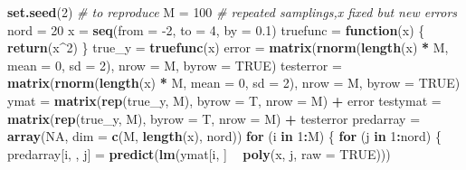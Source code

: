 \documentclass[]{article}
\newenvironment{Shaded}{\begin{snugshade}}{\end{snugshade}}
\newcommand{\CommentTok}[1]{\textcolor[rgb]{0.56,0.35,0.01}{\textit{#1}}}
\newcommand{\ControlFlowTok}[1]{\textcolor[rgb]{0.13,0.29,0.53}{\textbf{#1}}}
\newcommand{\DataTypeTok}[1]{\textcolor[rgb]{0.13,0.29,0.53}{#1}}
\newcommand{\DecValTok}[1]{\textcolor[rgb]{0.00,0.00,0.81}{#1}}
\newcommand{\FloatTok}[1]{\textcolor[rgb]{0.00,0.00,0.81}{#1}}
\newcommand{\KeywordTok}[1]{\textcolor[rgb]{0.13,0.29,0.53}{\textbf{#1}}}
\newcommand{\NormalTok}[1]{#1}
\newcommand{\OperatorTok}[1]{\textcolor[rgb]{0.81,0.36,0.00}{\textbf{#1}}}
\newcommand{\OtherTok}[1]{\textcolor[rgb]{0.56,0.35,0.01}{#1}}
\newcommand{\StringTok}[1]{\textcolor[rgb]{0.31,0.60,0.02}{#1}}
\begin{document}
\begin{Shaded}
\begin{Highlighting}[]
\KeywordTok{set.seed}\NormalTok{(}\DecValTok{2}\NormalTok{)  }\CommentTok{# to reproduce}
\NormalTok{M =}\StringTok{ }\DecValTok{100}  \CommentTok{# repeated samplings,x fixed but new errors}
\NormalTok{nord =}\StringTok{ }\DecValTok{20}
\NormalTok{x =}\StringTok{ }\KeywordTok{seq}\NormalTok{(}\DataTypeTok{from =} \DecValTok{-2}\NormalTok{, }\DataTypeTok{to =} \DecValTok{4}\NormalTok{, }\DataTypeTok{by =} \FloatTok{0.1}\NormalTok{)}
\NormalTok{truefunc =}\StringTok{ }\ControlFlowTok{function}\NormalTok{(x) \{}
    \KeywordTok{return}\NormalTok{(x}\OperatorTok{^}\DecValTok{2}\NormalTok{)}
\NormalTok{\}}
\NormalTok{true_y =}\StringTok{ }\KeywordTok{truefunc}\NormalTok{(x)}
\NormalTok{error =}\StringTok{ }\KeywordTok{matrix}\NormalTok{(}\KeywordTok{rnorm}\NormalTok{(}\KeywordTok{length}\NormalTok{(x) }\OperatorTok{*}\StringTok{ }\NormalTok{M, }\DataTypeTok{mean =} \DecValTok{0}\NormalTok{, }\DataTypeTok{sd =} \DecValTok{2}\NormalTok{), }\DataTypeTok{nrow =}\NormalTok{ M, }\DataTypeTok{byrow =} \OtherTok{TRUE}\NormalTok{)}
\NormalTok{testerror =}\StringTok{ }\KeywordTok{matrix}\NormalTok{(}\KeywordTok{rnorm}\NormalTok{(}\KeywordTok{length}\NormalTok{(x) }\OperatorTok{*}\StringTok{ }\NormalTok{M, }\DataTypeTok{mean =} \DecValTok{0}\NormalTok{, }\DataTypeTok{sd =} \DecValTok{2}\NormalTok{), }\DataTypeTok{nrow =}\NormalTok{ M, }
    \DataTypeTok{byrow =} \OtherTok{TRUE}\NormalTok{)}
\NormalTok{ymat =}\StringTok{ }\KeywordTok{matrix}\NormalTok{(}\KeywordTok{rep}\NormalTok{(true_y, M), }\DataTypeTok{byrow =}\NormalTok{ T, }\DataTypeTok{nrow =}\NormalTok{ M) }\OperatorTok{+}\StringTok{ }\NormalTok{error}
\NormalTok{testymat =}\StringTok{ }\KeywordTok{matrix}\NormalTok{(}\KeywordTok{rep}\NormalTok{(true_y, M), }\DataTypeTok{byrow =}\NormalTok{ T, }\DataTypeTok{nrow =}\NormalTok{ M) }\OperatorTok{+}\StringTok{ }\NormalTok{testerror}
\NormalTok{predarray =}\StringTok{ }\KeywordTok{array}\NormalTok{(}\OtherTok{NA}\NormalTok{, }\DataTypeTok{dim =} \KeywordTok{c}\NormalTok{(M, }\KeywordTok{length}\NormalTok{(x), nord))}
\ControlFlowTok{for}\NormalTok{ (i }\ControlFlowTok{in} \DecValTok{1}\OperatorTok{:}\NormalTok{M) \{}
    \ControlFlowTok{for}\NormalTok{ (j }\ControlFlowTok{in} \DecValTok{1}\OperatorTok{:}\NormalTok{nord) \{}
\NormalTok{        predarray[i, , j] =}\StringTok{ }\KeywordTok{predict}\NormalTok{(}\KeywordTok{lm}\NormalTok{(ymat[i, ] }\OperatorTok{~}\StringTok{ }\KeywordTok{poly}\NormalTok{(x, j, }\DataTypeTok{raw =} \OtherTok{TRUE}\NormalTok{)))}

\end{Highlighting}
\end{Shaded}
\end{document}
